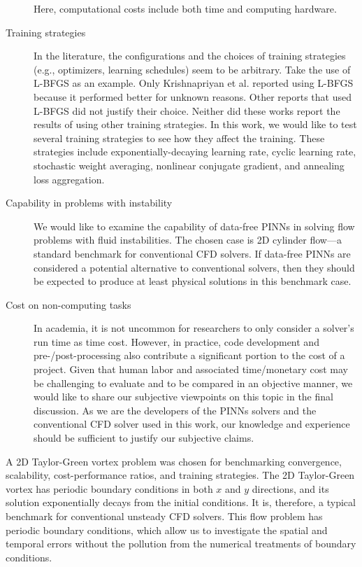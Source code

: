 \begin{description}
        Here, computational costs include both time and computing hardware.
    \item[Training strategies]
        In the literature, the configurations and the choices of training strategies (e.g., optimizers, learning schedules) seem to be arbitrary.
        Take the use of L-BFGS as an example.
        Only Krishnapriyan et al. \cite{krishnapriyan_characterizing_2021} reported using L-BFGS because it performed better for unknown reasons.
        Other reports that used L-BFGS did not justify their choice.
        Neither did these works report the results of using other training strategies.
        In this work, we would like to test several training strategies to see how they affect the training.
        These strategies include exponentially-decaying learning rate, cyclic learning rate, stochastic weight averaging, nonlinear conjugate gradient, and annealing loss aggregation.
    \item[Capability in problems with instability]
        We would like to examine the capability of data-free PINNs in solving flow problems with fluid instabilities.
        The chosen case is 2D cylinder flow---a standard benchmark for conventional CFD solvers.
        If data-free PINNs are considered a potential alternative to conventional solvers, then they should be expected to produce at least physical solutions in this benchmark case.
    \item[Cost on non-computing tasks]
        In academia, it is not uncommon for researchers to only consider a solver's run time as time cost.
        However, in practice, code development and pre-/post-processing also contribute a significant portion to the cost of a project.
        Given that human labor and associated time/monetary cost may be challenging to evaluate and to be compared in an objective manner, we would like to share our subjective viewpoints on this topic in the final discussion.
        As we are the developers of the PINNs solvers and the conventional CFD solver used in this work, our knowledge and experience should be sufficient to justify our subjective claims.
\end{description}

A 2D Taylor-Green vortex problem was chosen for benchmarking convergence, scalability, cost-performance ratios, and training strategies.
The 2D Taylor-Green vortex has periodic boundary conditions in both $x$ and $y$ directions, and its solution exponentially decays from the initial conditions.
It is, therefore, a typical benchmark for conventional unsteady CFD solvers.
This flow problem has periodic boundary conditions, which allow us to investigate the spatial and temporal errors without the pollution from the numerical treatments of boundary conditions.

